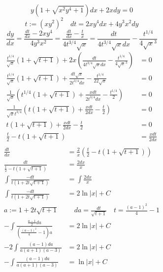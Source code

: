 \[y(1+\sqrt{x^2y^4+1})dx+2xdy=0\]
\[t := (xy^2)^2 \quad dt = 2xy^4dx + 4y^3x^2dy\]
\[\frac{dy}{dx} = \frac{\frac{dt}{dx}-2xy^4}{4y^3x^2} = \frac{\frac{dt}{dx} - \frac{t}{x}}{4t^{3/4}\sqrt x} = \frac{dt}{4t^{3/4}\sqrt xdx} - \frac{t^{1/4}}{4\sqrt x^3}\]
\begin{align*}
    \frac{t^{1/4}}{\sqrt x}(1+\sqrt{t+1})+2x\left(\frac{dt}{4t^{3/4}\sqrt xdx} - \frac{t^{1/4}}{4\sqrt x^3}\right) & = 0               \\
    \frac{t^{1/4}}{\sqrt x}(1+\sqrt{t+1})+\frac{dt\sqrt x}{2t^{3/4}dx} - \frac{t^{1/4}}{22\sqrt x}                 & = 0               \\
    \frac{1}{\sqrt x}\left(t^{1/4}(1+\sqrt{t+1}) +\frac{xdt}{2t^{3/4}dx} - \frac{t^{1/4}}{2} \right)               & = 0               \\
    \frac{1}{\sqrt x t^{3/4}}\left(t(1+\sqrt{t+1}) +\frac{xdt}{2dx} - \frac{t}{2} \right)                          & = 0               \\
    t(1+\sqrt{t+1}) +\frac{xdt}{2dx} - \frac{t}{2}                                                                 & = 0               \\
    \frac{t}{2} - t(1+\sqrt{t+1})                                                                                  & = \frac{xdt}{2dx} \\
\end{align*}
\begin{align*}
    \frac{dt}{dx}                                                   & = \frac{2}{x}\left(\frac{t}{2} - t(1+\sqrt{t+1})\right)         \\
    \frac{dt}{\frac{t}{2} - t(1+\sqrt{t+1})}                        & = \frac{2dx}{x}                                                 \\
    \int \frac{-dt}{t(1+2t\sqrt{t+1})}                              & = \int \frac{2dx}{x}                                            \\
    \int \frac{-dt}{t(1+2t\sqrt{t+1})}                              & = 2\ln |x| + C                                                  \\
    a := 1+2t\sqrt{t+1}                                             & \quad da = \frac{dt}{\sqrt{t+1}}  \quad t = \frac{(a-1)^2}{4}-1 \\
    -\int \frac{\frac{a-1}{2}da}{\left(\frac{(a-1)^2}{4}-1\right)a} & = 2\ln |x| + C                                                  \\
    -2\int \frac{(a-1)da}{a(a+1)(a-3)}                              & = 2\ln |x| + C                                                  \\
    -\int \frac{(a-1)da}{a(a+1)(a-3)}                               & = \ln |x| + C                                                   \\
\end{align*}
